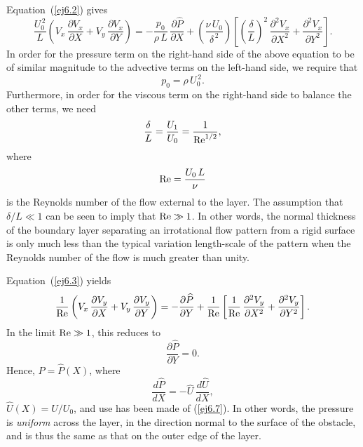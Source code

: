 Equation~(\ref{ej6.2}) gives
\begin{equation}
\frac{U_0^{\,2}}{L}\left(V_x\,\frac{\partial V_x}{\partial X} + V_y\,\frac{\partial V_x}{\partial Y}\right)
= - \frac{p_0}{\rho\,L}\,\frac{\partial \widehat{P}}{\partial X} + \left(\frac{\nu\,U_0}{\delta^{\,2}}\right)\left[\left(\frac{\delta}{L}\right)^2\,\frac{\partial^2 V_x}{\partial X^2}+\frac{\partial^2 V_x}{\partial Y^2}\right].
\end{equation}
In order for the pressure term on the right-hand side of the above equation to be of similar magnitude to the advective terms on the
left-hand side, we require that
\begin{equation}
p_0 = \rho\,U_0^{\,2}.
\end{equation}
Furthermore, in order for the viscous term on the right-hand side to balance  the other terms, we
need 
\begin{equation}\label{ej6.18}
\frac{\delta}{L} =\frac{U_1}{U_0}= \frac{1}{{\rm Re}^{1/2}},
\end{equation}
where
\begin{equation}
{\rm Re} = \frac{U_0\,L}{\nu}
\end{equation}
is the Reynolds number of the flow external to the layer.  The
assumption that $\delta/L\ll 1$ can be seen to imply that ${\rm Re}\gg 1$.  In other words, the normal thickness of the boundary layer separating an irrotational flow pattern 
from a rigid surface is only much less than the typical variation length-scale of the pattern when the Reynolds
number of the flow is much greater than unity.

Equation~(\ref{ej6.3}) yields
\begin{equation}
\frac{1}{{\rm Re}}\left(V_x\,\frac{\partial V_y}{\partial X} + V_y\,\frac{\partial V_y}{\partial Y}\right)
= - \frac{\partial \widehat{P}}{\partial Y} + \frac{1}{\rm Re}\left[\frac{1}{{\rm Re}}\,\frac{\partial^2 V_y}{\partial X^2}+\frac{\partial^2 V_y}{\partial Y^2}\right].
\end{equation}
In the limit ${\rm Re}\gg 1$, this reduces to
\begin{equation}
\frac{\partial \widehat{P}}{\partial Y} = 0.
\end{equation}
Hence, $\widehat{P}=\widehat{P}(X)$, where
\begin{equation}\label{ej6.23}
\frac{d\widehat{P}}{d X} = - \widehat{U}\,\frac{d\widehat{U}}{dX},
\end{equation}
 $\widehat{U}(X)=U/U_0$, and use has been made of (\ref{ej6.7}). In other words, the pressure
  is {\em uniform}\/ across the layer, in the direction normal to the surface of the obstacle, and is thus the same as that on the
 outer edge of the layer. 
 
